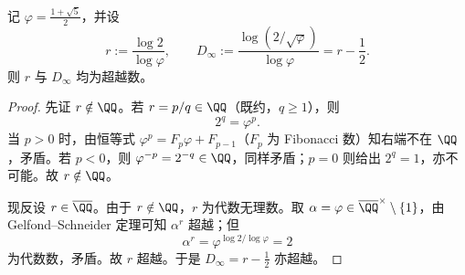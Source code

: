 \begin{proposition}\label{prop:near1-log2-over-logphi-Dinfty-transcendence}
记 \(\varphi=\frac{1+\sqrt5}{2}\)，并设
\[
r:=\frac{\log 2}{\log\varphi},
\qquad
D_\infty:=\frac{\log(2/\sqrt\varphi)}{\log\varphi}=r-\frac12.
\]
则 \(r\) 与 \(D_\infty\) 均为超越数。
\end{proposition}
\begin{proof}
先证 \(r\notin\QQ\)。若 \(r=p/q\in\QQ\)（既约，\(q\ge 1\)），则
\[
2^q=\varphi^p.
\]
当 \(p>0\) 时，由恒等式 \(\varphi^p=F_p\varphi+F_{p-1}\)（\(F_p\) 为 Fibonacci 数）知右端不在 \(\QQ\)，矛盾。若 \(p<0\)，则 \(\varphi^{-p}=2^{-q}\in\QQ\)，同样矛盾；\(p=0\) 则给出 \(2^q=1\)，亦不可能。故 \(r\notin\QQ\)。

现反设 \(r\in\overline{\QQ}\)。由于 \(r\notin\QQ\)，\(r\) 为代数无理数。取 \(\alpha=\varphi\in\overline{\QQ}^\times\setminus\{1\}\)，由 Gelfond--Schneider 定理可知 \(\alpha^r\) 超越；但
\[
\alpha^r=\varphi^{\log 2/\log\varphi}=2
\]
为代数数，矛盾。故 \(r\) 超越。于是 \(D_\infty=r-\frac12\) 亦超越。\cite{Baker1975TranscendentalNumberTheory}
\end{proof}

